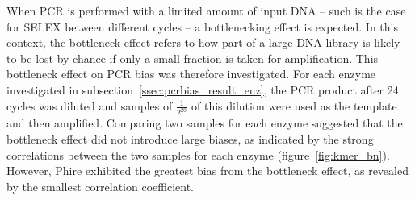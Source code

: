 \documentclass[a4paper, numbers=noenddot]{scrbook}
\begin{document}
When PCR is performed with a limited amount of input DNA -- such is the case for SELEX between different cycles -- a bottlenecking effect is expected.  In this context, the bottleneck effect refers to how part of a large DNA library is likely to be lost by chance if only a small fraction is taken for amplification.  This bottleneck effect on PCR bias was therefore investigated.  For each enzyme investigated in subsection~\ref{ssec:pcrbias_result_enz}, the PCR product after 24 cycles was diluted and samples of $\frac{1}{2^{20}}$ of this dilution were used as the template and then amplified.  Comparing two samples for each enzyme suggested that the bottleneck effect did not introduce large biases, as indicated by the strong correlations between the two samples for each enzyme (figure~\ref{fig:kmer_bn}).  However, Phire exhibited the greatest bias from the bottleneck effect, as revealed by the smallest correlation coefficient.
\end{document}
